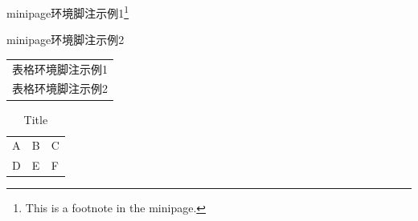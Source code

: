 \documentclass{ctexart}
\begin{document}
            \begin{minipage}{\linewidth}
                minipage环境脚注示例1\footnote{This is a footnote in the minipage.} %

                minipage环境脚注示例2\footnotemark %
            \end{minipage}

            \begin{tabular}{l}
                表格环境脚注示例1\footnotemark\\
                表格环境脚注示例2\footnotemark
            \end{tabular}
            


            \begin{table}
                \centering
                \caption{Title\protect\footnotemark}
                \begin{tabular}{l|l|l}
                    \hline
                    A&B&C\\
                    D&E&F\\
                    \hline
                \end{tabular}
            \end{table}
\end{document}
